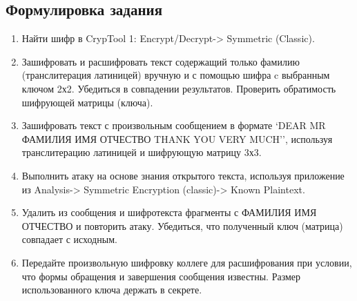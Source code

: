 \documentclass[a4paper, 14pt]{extarticle}
\begin{document}
\subsection{Формулировка задания}
\begin{enumerate}
    \item Найти шифр в CrypTool 1: Encrypt/Decrypt-> Symmetric (Classic).
    \item Зашифровать и расшифровать текст содержащий только фамилию (транслитерация латиницей) вручную и с помощью шифра c выбранным ключом 2х2. Убедиться в совпадении результатов. Проверить обратимость шифрующей матрицы (ключа).
    \item Зашифровать текст с произвольным сообщением в формате `DEAR MR ФАМИЛИЯ ИМЯ ОТЧЕСТВО THANK YOU VERY MUCH'', используя транслитерацию латиницей и шифрующую матрицу 3х3.
    \item Выполнить атаку на основе знания открытого текста, используя приложение из Analysis-> Symmetric Encryption (classic)-> Known Plaintext.
    \item Удалить из сообщения и шифротекста фрагменты с ФАМИЛИЯ ИМЯ ОТЧЕСТВО и повторить атаку. Убедиться, что полученный ключ (матрица) совпадает с исходным.
    \item Передайте произвольную шифровку коллеге для расшифрования при условии, что формы обращения и завершения сообщения известны. Размер использованного ключа держать в секрете.
\end{enumerate}
\end{document}
